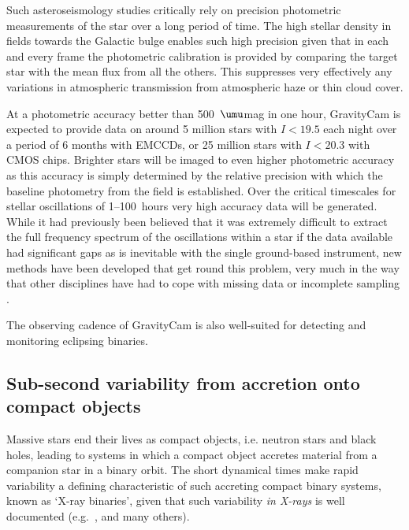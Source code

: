 \documentclass{pasa}%
\begin{document}
Such asteroseismology studies critically rely on precision photometric measurements of the star over a long period of time. The high stellar density in fields towards the Galactic bulge enables such high
precision given that in each and every frame the photometric calibration is provided by comparing the target star with the mean flux from all the others.  This suppresses very effectively any variations in atmospheric transmission from atmospheric haze or thin cloud cover.

At a photometric accuracy better than 500~$\umu$mag in one hour, {\mbox GravityCam} is expected to provide data on around 5 million stars with $I < 19.5$ each night over a period of 6 months with \mbox{EMCCDs}, or 25 million stars with $I < 20.3$ with CMOS chips. Brighter stars will be imaged to even higher photometric accuracy as this accuracy is simply determined by the relative precision with which the baseline photometry from the field is established.  Over the critical timescales for stellar oscillations of 1--100~hours very high accuracy data will be generated.  While it had previously been believed that it was extremely difficult to extract the full frequency spectrum of the oscillations within a star if the data available had significant gaps as is inevitable with the single ground-based instrument, new methods have been developed that get round this problem, very much in the way that other disciplines have had to cope with missing data or incomplete sampling \citep{Pires+2015}. 
 
The observing cadence of \mbox{GravityCam} is also well-suited for detecting and monitoring eclipsing binaries.

\subsection{Sub-second variability from accretion onto compact objects}

Massive stars end their lives as compact objects, i.e. neutron stars and black holes, leading to systems in which a compact object accretes material from a companion star in a binary orbit. The short dynamical times make rapid variability a defining characteristic of such accreting compact binary systems, known as \lq X-ray binaries\rq, given that such variability {\em in X-rays} is well documented (e.g.\ \citealt{bellonihasinger90}, \citealt{vanderklis95} and many others). 
\end{document}

